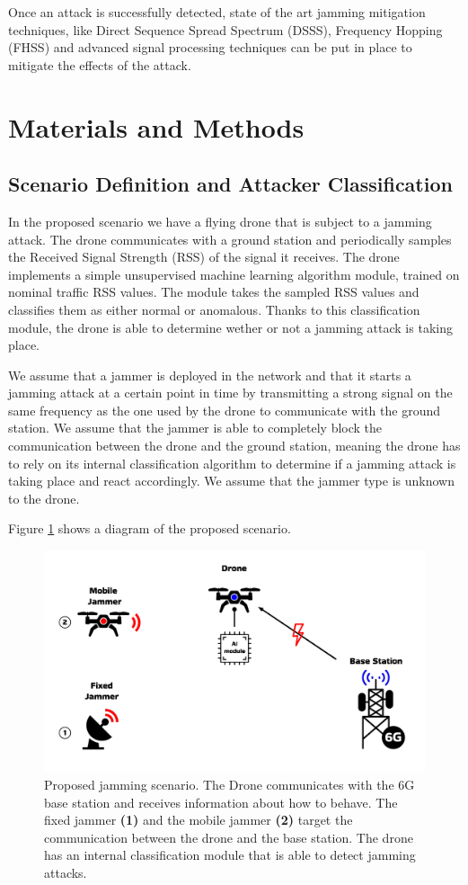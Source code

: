 \documentclass[futureinternet,article,submit,pdftex,moreauthors]{Definitions/mdpi}
\begin{document}
Once an attack is successfully detected, state of the art jamming mitigation techniques, like Direct Sequence Spread Spectrum (DSSS), Frequency Hopping (FHSS) and advanced signal processing techniques can be put in place to mitigate the 
effects of the attack. 

\section{Materials and Methods}

\subsection{Scenario Definition and Attacker Classification}

In the proposed scenario we have a flying drone that is subject to a jamming attack. The drone communicates with a ground station and periodically samples the Received Signal Strength (RSS) of the signal it receives. 
The drone implements a simple unsupervised machine learning algorithm module, trained on nominal traffic RSS values. The module takes the sampled RSS values and classifies them as either normal or anomalous. Thanks to this classification module, the drone is able to determine wether or not a jamming attack is taking place. 

We assume that a jammer is deployed in the network and that it starts a jamming attack at a certain point in time by transmitting a strong signal on the same frequency as the one used by the drone to communicate with the ground station.
We assume that the jammer is able to completely block the communication between the drone and the ground station, meaning the drone has to rely on its internal classification algorithm to determine if a jamming attack is taking place and react accordingly.
We assume that the jammer type is unknown to the drone. 

Figure \ref{fig:CombinedJammingscenariosDiagram} shows a diagram of the proposed scenario. 

\begin{figure}[H]
	\includegraphics[width=10.5 cm]{img/CombinedJammingscenariosDiagram.jpg}
	\caption{Proposed jamming scenario. The Drone communicates with the 6G base station and receives information about how to behave. The fixed jammer \textbf{(1)} and the mobile jammer \textbf{(2)} target the communication between the drone and the base station. The drone has an internal classification module that is able to detect jamming attacks.}
	\label{fig:CombinedJammingscenariosDiagram}
	\end{figure}   
	\unskip
\end{document}
